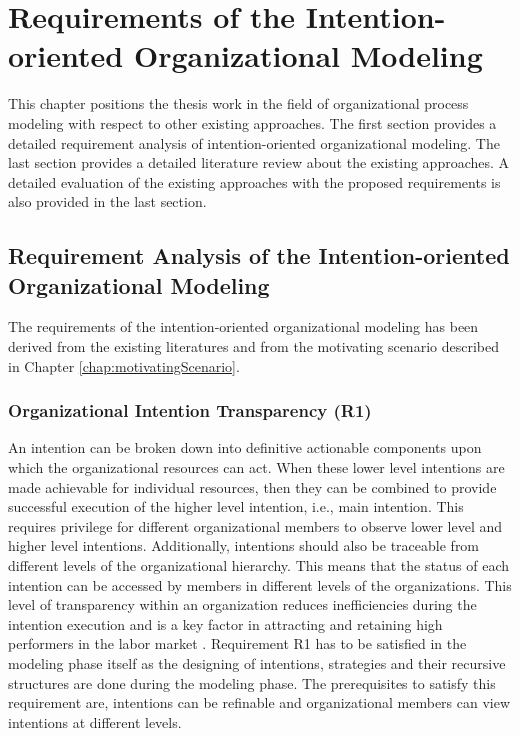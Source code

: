 \chapter{Requirements of the Intention-oriented Organizational Modeling}
\label{chap:analysis}
This chapter positions the thesis work in the field of organizational process modeling with respect to other existing approaches. The first section provides a detailed requirement analysis of intention-oriented organizational modeling. The last section provides a detailed literature review about the existing approaches. A detailed evaluation of the existing approaches with the proposed requirements is also provided in the last section.

\section{Requirement Analysis of the Intention-oriented Organizational Modeling}
\label{sec:requirementssupoorting}
The requirements of the intention-oriented organizational modeling has been derived from the existing literatures \cite{McManus2007, Mandic2010,Bleistein2006, Lacom, Brambilla2012} and from the motivating scenario described in Chapter \ref{chap:motivatingScenario}. 

\subsection{Organizational Intention Transparency (R1)}
An intention can be broken down into definitive actionable components upon which the organizational resources can act. When these lower level intentions are made achievable for individual resources, then they can be combined to provide successful execution of the higher level intention, i.e., main intention. This requires privilege for different organizational members to observe lower level and higher level intentions. Additionally, intentions should also be traceable from different levels of the organizational hierarchy. This means that the status of each intention can be accessed by members in different levels of the organizations. This level of transparency within an organization reduces inefficiencies during the intention execution and is a key factor in attracting and retaining high performers in the labor market \cite{McManus2007}. Requirement R1 has to be satisfied in the modeling phase itself as the designing of intentions, strategies and their recursive structures are done during the modeling phase. The prerequisites to satisfy this requirement are, intentions can be refinable and organizational members can view intentions at different levels. 

